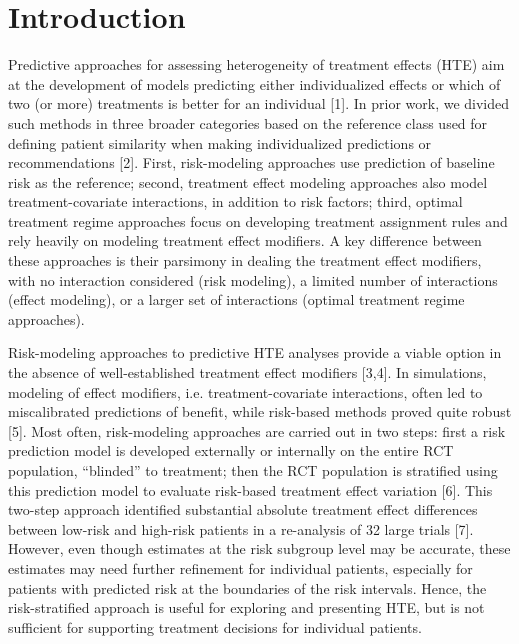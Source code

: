 \documentclass[]{elsarticle} %
\begin{document}
\doublespacing 
\linenumbers

\hypertarget{introduction}{%
\section{Introduction}\label{introduction}}

Predictive approaches for assessing heterogeneity of treatment effects
(HTE) aim at the development of models predicting either individualized
effects or which of two (or more) treatments is better for an individual
{[}1{]}. In prior work, we divided such methods in three broader
categories based on the reference class used for defining patient
similarity when making individualized predictions or recommendations
{[}2{]}. First, risk-modeling approaches use prediction of baseline risk
as the reference; second, treatment effect modeling approaches also
model treatment-covariate interactions, in addition to risk factors;
third, optimal treatment regime approaches focus on developing treatment
assignment rules and rely heavily on modeling treatment effect
modifiers. A key difference between these approaches is their parsimony
in dealing the treatment effect modifiers, with no interaction
considered (risk modeling), a limited number of interactions (effect
modeling), or a larger set of interactions (optimal treatment regime
approaches).

Risk-modeling approaches to predictive HTE analyses provide a viable
option in the absence of well-established treatment effect modifiers
{[}3,4{]}. In simulations, modeling of effect modifiers, i.e.
treatment-covariate interactions, often led to miscalibrated predictions
of benefit, while risk-based methods proved quite robust {[}5{]}. Most
often, risk-modeling approaches are carried out in two steps: first a
risk prediction model is developed externally or internally on the
entire RCT population, ``blinded'' to treatment; then the RCT population
is stratified using this prediction model to evaluate risk-based
treatment effect variation {[}6{]}. This two-step approach identified
substantial absolute treatment effect differences between low-risk and
high-risk patients in a re-analysis of 32 large trials {[}7{]}. However,
even though estimates at the risk subgroup level may be accurate, these
estimates may need further refinement for individual patients,
especially for patients with predicted risk at the boundaries of the
risk intervals. Hence, the risk-stratified approach is useful for
exploring and presenting HTE, but is not sufficient for supporting
treatment decisions for individual patients.
\end{document}
